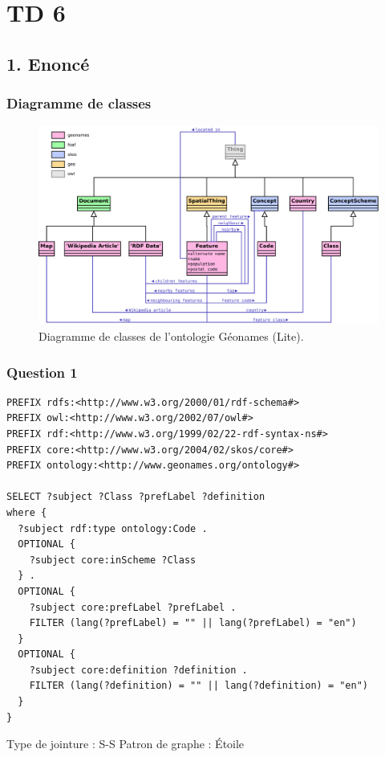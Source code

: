 
\section{TD 6}
\subsection{1. Enoncé}

\subsubsection{Diagramme de classes}
\begin{figure}[H]
  \includegraphics[width=\textwidth]{../diag_class}
  \caption{Diagramme de classes de l'ontologie Géonames (Lite).}
\end{figure}

\subsubsection{Question 1}
\begin{verbatim}
PREFIX rdfs:<http://www.w3.org/2000/01/rdf-schema#>
PREFIX owl:<http://www.w3.org/2002/07/owl#>
PREFIX rdf:<http://www.w3.org/1999/02/22-rdf-syntax-ns#>
PREFIX core:<http://www.w3.org/2004/02/skos/core#>
PREFIX ontology:<http://www.geonames.org/ontology#>

SELECT ?subject ?Class ?prefLabel ?definition
where {
  ?subject rdf:type ontology:Code .
  OPTIONAL {
    ?subject core:inScheme ?Class
  } .
  OPTIONAL {
    ?subject core:prefLabel ?prefLabel .
    FILTER (lang(?prefLabel) = "" || lang(?prefLabel) = "en")
  }
  OPTIONAL {
    ?subject core:definition ?definition .
    FILTER (lang(?definition) = "" || lang(?definition) = "en")
  }
}
\end{verbatim}
Type de jointure : S-S Patron de graphe : Étoile
